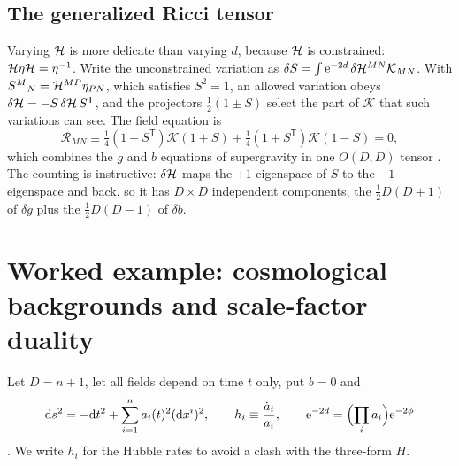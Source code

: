 \subsection{The generalized Ricci tensor}
Varying $\mathcal{H}$ is more delicate than varying $d$, because $\mathcal{H}$ is constrained:
$\mathcal{H}\eta\mathcal{H}=\eta^{-1}$. Write the unconstrained variation as
$\delta S=\int\mathrm{e}^{-2d}\,\delta\mathcal{H}^{MN}\mathcal K_{MN}$. With $S^M{}_N=\mathcal{H}^{MP}\eta_{PN}$, which
satisfies $S^2=1$, an allowed variation obeys $\delta\mathcal{H}=-S\,\delta\mathcal{H}\,S^{\mathsf T}$, and the
projectors $\tfrac12(1\pm S)$ select the part of $\mathcal K$ that such variations can see. The
field equation is
\begin{equation}\label{eq:dftaction:ricci}
\mathcal R_{MN}\equiv\tfrac14(1-S^{\mathsf T})\mathcal K(1+S)+\tfrac14(1+S^{\mathsf T})
\mathcal K(1-S)=0,
\end{equation}
which combines the $g$ and $b$ equations of supergravity in one
$O(D,D)$ tensor . The counting is
instructive: $\delta\mathcal{H}$ maps the $+1$ eigenspace of $S$ to the $-1$ eigenspace and back, so it
has $D\times D$ independent components, the $\tfrac12D(D+1)$ of $\delta g$ plus the
$\tfrac12D(D-1)$ of $\delta b$.

\section{Worked example: cosmological backgrounds and scale-factor duality}
\label{sec:dftaction:example}

Let $D=n+1$, let all fields depend on time $t$ only, put $b=0$ and
\begin{equation}\label{eq:dftaction:cosmo}
\mathrm{d} s^2=-\mathrm{d} t^2+\sum_{i=1}^na_i(t)^2(\mathrm{d} x^i)^2,\qquad h_i\equiv\frac{\dot a_i}{a_i},\qquad
\mathrm{e}^{-2d}=\Bigl(\prod_ia_i\Bigr)\mathrm{e}^{-2\phi}
\end{equation}
. We write $h_i$ for the Hubble rates to avoid a clash with
the three-form $H$.

